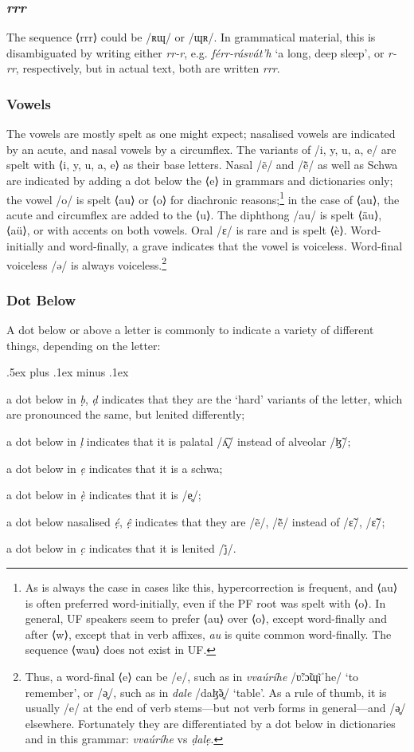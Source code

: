 \documentclass[a4paper, 12pt, twoside, final]{article}
\let \w \textit
\begin{document}
\subsubsection{\textit{rrr}}
The sequence ⟨rrr⟩ could be /ʀɰ/ or /ɰʀ/. In grammatical material, this is disambiguated by writing either \w{rr-r}, e.g.
\w{férr-rásvát’h} ‘a long, deep sleep’, or \w{r-rr}, respectively, but in actual text, both are written \w{rrr}.

\subsubsection{Vowels}
The vowels are mostly spelt as one might expect; nasalised vowels are indicated by an acute, and nasal vowels by a circumflex.
The variants of /i, y, u, a, e/ are spelt with ⟨i, y, u, a, e⟩ as their base letters. Nasal /ẽ/ and /ẽ̃/ as well as Schwa are
indicated by adding a dot below the ⟨e⟩ in grammars and dictionaries only; the vowel /o/ is spelt ⟨au⟩ or ⟨o⟩ for diachronic reasons;\footnote{As is always the
case in cases like this, hypercorrection is frequent, and ⟨au⟩ is often preferred word-initially, even if the
PF root was spelt with ⟨o⟩. In general, UF speakers seem to prefer ⟨au⟩ over ⟨o⟩, except word-finally and after ⟨w⟩, except
that in verb affixes, \w{au} is quite common word-finally. The sequence ⟨wau⟩ does not exist in UF.} in the case of
⟨au⟩, the acute and circumflex are added to the ⟨u⟩. The diphthong /au/ is spelt ⟨äu⟩, ⟨aü⟩, or with accents on both vowels. Oral
/ɛ/ is rare and is spelt ⟨è⟩. Word-initially and word-finally, a grave indicates that the vowel is voiceless. Word-final
voiceless /ə/ is always voiceless.\footnote{Thus, a word-final ⟨e⟩
can be /e/, such as in \w{vvaúríhe} /ʋ̃ːɔ̃ɰĩˈhe/ ‘to remember’, or /ə̥/, such as in \w{dale} /daɮ̃ə̥/ ‘table’. As a rule of thumb, it is
usually /e/ at the end of verb stems—but not verb forms in general—and /ə̥/ elsewhere. Fortunately they are differentiated by a
dot below in dictionaries and in this grammar: \w{vvaúríhe} vs \w{ḍalẹ}.}

\subsubsection{Dot Below}
A dot below or above a letter is commonly to indicate
a variety of different things, depending on the letter:
\begin{items}\itemsep .5ex plus .1ex minus .1ex\relax
\item a dot below in \w{ḅ}, \w{ḍ} indicates that they are the ‘hard’ variants of the letter, which are pronounced
      the same, but lenited differently;
\item a dot below in \w{ḷ} indicates that it is palatal /ʎ̝̃/ instead of alveolar /ɮ̃/;
\item a dot below in \w{ẹ} indicates that it is a schwa;
\item a dot below in \w{ẹ̀} indicates that it is /e̥/;
\item a dot below nasalised \w{ẹ́}, \w{ệ} indicates that they are /ẽ/, /ẽ̃/ instead of /ɛ̃/, /ɛ̃̃/;
\item a dot below in \w{c̣} indicates that it is lenited /j̊/.
\end{items}
\end{document}
